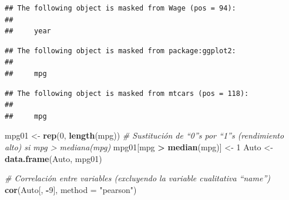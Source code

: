 \documentclass[]{book}
\newenvironment{Shaded}{\begin{snugshade}}{\end{snugshade}}
\newcommand{\KeywordTok}[1]{\textcolor[rgb]{0.13,0.29,0.53}{\textbf{#1}}}
\newcommand{\DataTypeTok}[1]{\textcolor[rgb]{0.13,0.29,0.53}{#1}}
\newcommand{\DecValTok}[1]{\textcolor[rgb]{0.00,0.00,0.81}{#1}}
\newcommand{\StringTok}[1]{\textcolor[rgb]{0.31,0.60,0.02}{#1}}
\newcommand{\CommentTok}[1]{\textcolor[rgb]{0.56,0.35,0.01}{\textit{#1}}}
\newcommand{\OperatorTok}[1]{\textcolor[rgb]{0.81,0.36,0.00}{\textbf{#1}}}
\newcommand{\NormalTok}[1]{#1}
\begin{document}
\begin{verbatim}
## The following object is masked from Wage (pos = 94):
## 
##     year
\end{verbatim}

\begin{verbatim}
## The following object is masked from package:ggplot2:
## 
##     mpg
\end{verbatim}

\begin{verbatim}
## The following object is masked from mtcars (pos = 118):
## 
##     mpg
\end{verbatim}

\begin{Shaded}
\begin{Highlighting}[]
\NormalTok{mpg01 <-}\StringTok{ }\KeywordTok{rep}\NormalTok{(}\DecValTok{0}\NormalTok{, }\KeywordTok{length}\NormalTok{(mpg))}
\CommentTok{# Sustitución de “0”s por “1”s (rendimiento alto) si mpg > mediana(mpg) }
\NormalTok{mpg01[mpg }\OperatorTok{>}\StringTok{ }\KeywordTok{median}\NormalTok{(mpg)] <-}\StringTok{ }\DecValTok{1}
\NormalTok{Auto <-}\StringTok{ }\KeywordTok{data.frame}\NormalTok{(Auto, mpg01)}
\end{Highlighting}
\end{Shaded}

\begin{Shaded}
\begin{Highlighting}[]
\CommentTok{# Correlación entre variables (excluyendo la variable cualitativa “name”)}
\KeywordTok{cor}\NormalTok{(Auto[, }\OperatorTok{-}\DecValTok{9}\NormalTok{], }\DataTypeTok{method =} \StringTok{"pearson"}\NormalTok{)}
\end{Highlighting}
\end{Shaded}
\end{document}
